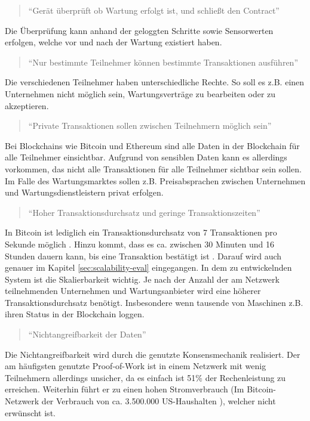 \begin{quote}
    ``Gerät überprüft ob Wartung erfolgt ist, und schließt den Contract''
\end{quote}

Die Überprüfung kann anhand der geloggten Schritte sowie Sensorwerten erfolgen, welche vor und nach der Wartung existiert haben.

\begin{quote}
    ``Nur bestimmte Teilnehmer können bestimmte Transaktionen ausführen''
\end{quote}

Die verschiedenen Teilnehmer haben unterschiedliche Rechte. So soll es z.B. einen Unternehmen nicht möglich sein, Wartungsverträge zu bearbeiten oder zu akzeptieren.

\begin{quote}
    ``Private Transaktionen sollen zwischen Teilnehmern möglich sein''
\end{quote}

Bei Blockchains wie Bitcoin und Ethereum sind alle Daten in der Blockchain für alle Teilnehmer einsichtbar. Aufgrund von sensiblen Daten kann es allerdings vorkommen, das nicht alle Transaktionen für alle Teilnehmer sichtbar sein sollen. Im Falle des Wartungsmarktes sollen z.B. Preisabsprachen zwischen Unternehmen und Wartungsdienstleistern privat erfolgen.

\begin{quote}
    ``Hoher Transaktionsdurchsatz und geringe Transaktionszeiten''
\end{quote}

In Bitcoin ist lediglich ein Transaktionsdurchsatz von 7 Transaktionen pro Sekunde möglich \cite{ZhengBlockchainChallengesOpportunities2017}. Hinzu kommt, dass es ca. zwischen 30 Minuten und 16 Stunden dauern kann, bis eine Transaktion bestätigt ist \cite{BuchkoHowLongBitcoin2017}. Darauf wird auch genauer im Kapitel \ref{sec:scalability-eval} eingegangen. In dem zu entwickelnden System ist die Skalierbarkeit wichtig. Je nach der Anzahl der am Netzwerk teilnehmenden Unternehmen und Wartungsanbieter wird eine höherer Transaktionsdurchsatz benötigt. Insbesondere wenn tausende von Maschinen z.B. ihren Status in der Blockchain loggen.

\begin{quote}
    ``Nichtangreifbarkeit der Daten''
\end{quote}

Die Nichtangreifbarkeit wird durch die genutzte Konsensmechanik realisiert. Der am häufigsten genutzte Proof-of-Work ist in einem Netzwerk mit wenig Teilnehmern allerdings unsicher, da es einfach ist 51\% der Rechenleistung zu erreichen. Weiterhin führt er zu einen hohen Stromverbrauch (Im Bitcoin-Netzwerk der Verbrauch von ca. 3.500.000 US-Haushalten \cite{BitcoinEnergyConsumption}), welcher nicht erwünscht ist.

